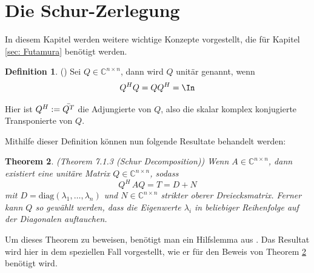 \documentclass[a4paper,12pt]{report}
\newcommand{\C}{\mathbb C}
\newcommand{\diag}{\text{diag}}
\newcommand{\AlamB}{A-\lambda\,B}
\theoremstyle{plain} %
\newtheorem{theorem}{Theorem}
\theoremstyle{definition} %
\newtheorem{definition}[theorem]{Definition}
\theoremstyle{remark}
\begin{document}
      \section{Die Schur-Zerlegung}
            In diesem Kapitel werden weitere wichtige Konzepte vorgestellt, die für Kapitel \ref{sec: Futamura} benötigt werden.

            \begin{definition}(\cite[S. 73]{matrixGolub})
                  Sei $Q \in\C^{n\times n}$, dann wird $Q$ unitär genannt, wenn
                  $$Q^HQ = QQ^H=\In$$
            \end{definition}

            Hier ist $Q^H := \Bar{Q^T}$ die Adjungierte von $Q$, also die skalar komplex konjugierte Transponierte von $Q$.

            Mithilfe dieser Definition können nun folgende Resultate behandelt werden:
            \begin{theorem}(Theorem 7.1.3 (Schur Decomposition)\cite[S. 313]{matrixGolub})
                  \label{thrm: Schur Zerlegung}
                  Wenn $A \in \C^{n\times n}$, dann existiert eine unitäre Matrix $Q\in\C^{n\times n}$, sodass
                  \begin{equation}
                        \label{eqn: Schur_Resultat}
                        Q^H\,AQ = T = D+N
                  \end{equation}
                  mit $D=\diag(\lambda_1,\dots,\lambda_n)$ und $N\in\C^{n\times n}$ strikter oberer Dreiecksmatrix.
                  Ferner kann $Q$ so gewählt werden, dass die Eigenwerte $\lambda_i$ in beliebiger Reihenfolge auf der Diagonalen auftauchen.
            \end{theorem}

            Um dieses Theorem zu beweisen, benötigt man ein Hilfslemma aus \cite[S.312]{matrixGolub}.
            Das Resultat wird hier in dem speziellen Fall vorgestellt, wie er für den Beweis von Theorem \ref{thrm: Schur Zerlegung} benötigt wird.
\end{document}
